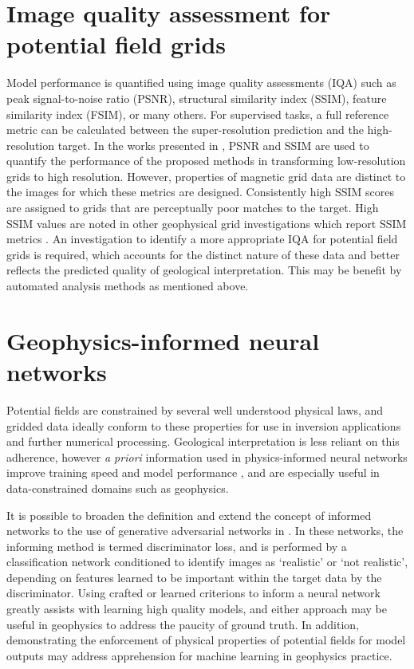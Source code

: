 \section{Image quality assessment for potential field grids}
Model performance is quantified using image quality assessments (IQA) such as peak signal-to-noise ratio (PSNR), structural similarity index (SSIM), feature similarity index (FSIM), or many others.
For supervised tasks, a full reference metric can be calculated between the super-resolution prediction and the high-resolution target.
In the works presented in , PSNR and SSIM are used to quantify the performance of the proposed methods in transforming low-resolution grids to high resolution.
However, properties of magnetic grid data are distinct to the images for which these metrics are designed.
Consistently high SSIM scores are assigned to grids that are perceptually poor matches to the target.
High SSIM values are noted in other geophysical grid investigations which report SSIM metrics \parencite{wangDeeplearningbasedSeismicData2018,bavandsavadkoohiHighresolutionAeromagneticMap2023}.
An investigation to identify a more appropriate IQA for potential field grids is required, which accounts for the distinct nature of these data and better reflects the predicted quality of geological interpretation.
This may be benefit by automated analysis methods as mentioned above.

\section{Geophysics-informed neural networks}
Potential fields are constrained by several well understood physical laws, and gridded data ideally conform to these properties for use in inversion applications and further numerical processing.
Geological interpretation is less reliant on this adherence, however \emph{a priori} information used in physics-informed neural networks improve training speed and model performance \parencite{raissiPhysicsinformedNeuralNetworks2019}, and are especially useful in data-constrained domains such as geophysics.

It is possible to broaden the definition and extend the concept of informed networks to the use of generative adversarial networks in .
In these networks, the informing method is termed discriminator loss, and is performed by a classification network conditioned to identify images as `realistic' or `not realistic', depending on features learned to be important within the target data by the discriminator.
Using crafted or learned criterions to inform a neural network greatly assists with learning high quality models, and either approach may be useful in geophysics to address the paucity of ground truth.
In addition, demonstrating the enforcement of physical properties of potential fields for model outputs may address apprehension for machine learning in geophysics practice.

